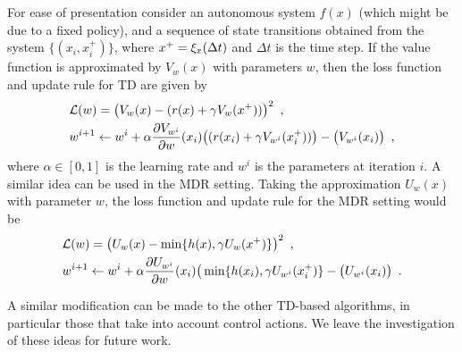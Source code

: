 For ease of presentation consider an autonomous system $f(x)$ (which might be due to a fixed policy), and a sequence of state transitions obtained from the system $\{(x_i,x_i^+)\}$, where $x^+=\xi_x(\Delta t)$ and $\Delta t$ is the time step. If the value function is approximated by $V_w(x)$ with parameters $w$, then the loss function and update rule for TD are given by
%
\begin{equation}
\begin{split}
&\mathcal{L}(w)=\big(V_{w}(x) - (r(x)+\gamma V_{w}(x^+))\big)^2 \enspace,\\
&w^{i+1} \leftarrow w^i + \alpha\frac{\partial V_{w^i}}{\partial w}(x_i)\big((r(x_i)+\gamma V_{w^i}(x^+_i))\big)- \big(V_{w^i}(x_i)\big)\enspace,
\end{split}
\end{equation}%
\noindent where $\alpha \in [0,1]$ is the learning rate and $w^i$ is the parameters at iteration $i$. A similar idea can be used in the MDR setting. Taking the approximation $U_w(x)$ with parameter $w$, the loss function and update rule for the MDR setting would be
%
\begin{equation}
\begin{split}
&\mathcal{L}(w)=\big(U_{w}(x) - \min\{h(x),\gamma U_{w}(x^+)\}\big)^2\enspace,\\
&w^{i+1} \leftarrow w^i + \alpha\frac{\partial U_{w^i}}{\partial w}(x_i)\big(\min\{h(x_i),\gamma U_{w^i}(x^+_i)\}- \big(U_{w^i}(x_i)\big)\enspace.
\end{split}
\end{equation}

A similar modification can be made to the other TD-based algorithms, in particular those that take into account control actions. We leave the investigation of these ideas for future work. 




